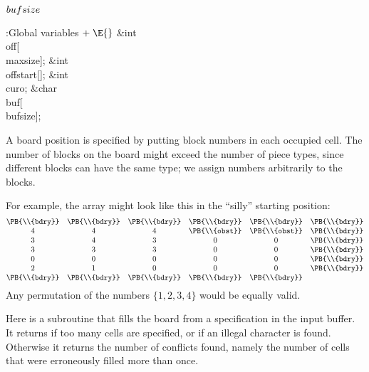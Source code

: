 \B\D$\\{bufsize}$ \5
\par
\Y\B\4:Global variables\X${}\mathrel+\E{}$\6
\&{int} \\{off}[\\{maxsize}];\6
\&{int} \\{offstart}[];\6
\&{int} \\{curo};\6
\&{char} \\{buf}[\\{bufsize}];\par
\fi

A board position is specified by putting block numbers in
each occupied
cell. The number of blocks on the board might exceed the number of piece
types, since different blocks can have the same type; we assign numbers
arbitrarily to the blocks.

For example, the  array might look like this in the ``silly''
starting position:
$$\vbox{\halign{\hfil#\hfil&&\quad\hfil#\hfil\cr
\PB{\\{bdry}}&\PB{\\{bdry}}&\PB{\\{bdry}}&\PB{\\{bdry}}&\PB{\\{bdry}}&\PB{%
\\{bdry}}\cr
4&4&4&\PB{\\{obst}}&\PB{\\{obst}}&\PB{\\{bdry}}\cr
3&4&3&0&0&\PB{\\{bdry}}\cr
3&3&3&0&0&\PB{\\{bdry}}\cr
0&0&0&0&0&\PB{\\{bdry}}\cr
2&1&0&0&0&\PB{\\{bdry}}\cr
\PB{\\{bdry}}&\PB{\\{bdry}}&\PB{\\{bdry}}&\PB{\\{bdry}}&\PB{\\{bdry}}\cr}}$$
Any permutation of the numbers $\{1,2,3,4\}$ would be equally valid.

\fi

Here is a subroutine that fills the board from a
specification in
the input buffer. It returns  if too many cells are specified,
or  if an illegal character is found.
Otherwise it returns the number of conflicts found, namely the
number of cells that were erroneously filled more than once.

